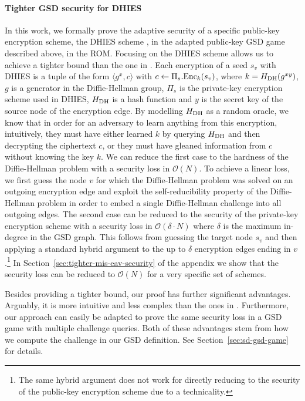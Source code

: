 \paragraph{Tighter GSD security for DHIES} In this work, we formally prove the adaptive security of a specific public-key encryption scheme, the DHIES  scheme \cite{dhies}, in the adapted public-key GSD game described above, in the ROM. Focusing on the DHIES scheme allows us to achieve a tighter bound than the one in \cite{ttkem}. Each encryption of a seed $s_v$ with DHIES is a tuple of the form $\langle g^{x}, c \rangle$ with $c \leftarrow \Pi_s.\mathrm{Enc}_{k}(s_v)$, where $k = H_\mathrm{DH}(g^{x y})$, $g$ is a generator in the Diffie-Hellman group, $\Pi_s$ is the private-key encryption scheme used in DHIES, $H_\mathrm{DH}$ is a hash function and $y$ is the secret key of the source node of the encryption edge. By modelling $H_\mathrm{DH}$ as a random oracle, we know that in order for an adversary to learn anything from this encryption, intuitively, they must have either learned $k$ by querying $H_\mathrm{DH}$ and then decrypting the ciphertext $c$, or they must have gleaned information from $c$ without knowing the key $k$. We can reduce the first case to the hardness of the Diffie-Hellman problem with a security loss in $\mathcal{O}(N)$. To achieve a linear loss, we first guess the node $v$ for which the Diffie-Hellman problem was solved on an outgoing encryption edge and exploit the self-reducibility property of the Diffie-Hellman problem in order to embed a single Diffie-Hellman challenge into all outgoing edges. The second case can be reduced to the security of the private-key encryption scheme with a security loss in $\mathcal{O}(\delta \cdot N)$ where $\delta$ is the maximum in-degree in the GSD graph.
This follows from guessing the target node $s_v$ and then applying a standard hybrid argument to the up to $\delta$ encryption edges ending in $v$.\footnote{The same hybrid argument does not work for directly reducing to the security of the public-key encryption scheme due to a technicality.} In Section~\ref{sec:tighter-mis-eav-security} of the appendix we show that the security loss can be reduced to $\mathcal{O}(N)$ for a very specific set of schemes.

Besides providing a tighter bound, our proof has further significant advantages. Arguably, it is more intuitive and less complex than the ones in \cite{modular-group-messaging,ttkem}. Furthermore, our approach can easily be adapted to prove the same security loss in a GSD game with multiple challenge queries. Both of these advantages stem from how we compute the challenge in our GSD definition. See Section~\ref{sec:sd-gsd-game} for details.

